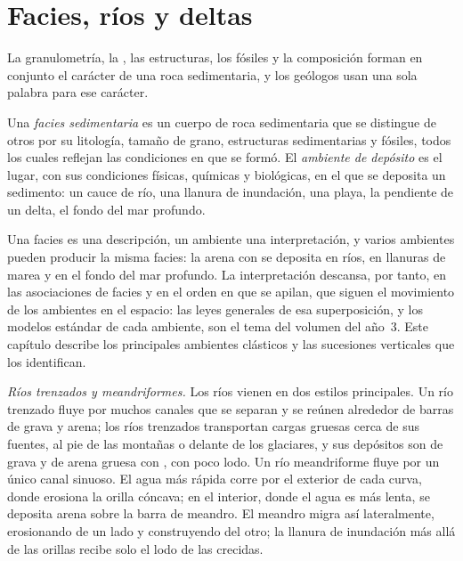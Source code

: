 \section{Facies, ríos y deltas}\label{sec:b1:clastic-sediments:rivers-deltas}

La granulometría, la , las estructuras, los fósiles y la composición forman en conjunto el carácter de una roca sedimentaria, y los geólogos usan una sola palabra para ese carácter.

\begin{definition}\label{def:b1:clastic-sediments:facies}
Una \emph{facies sedimentaria} es un cuerpo de roca sedimentaria que se distingue de otros por su litología, tamaño de grano, estructuras sedimentarias
y fósiles, todos los cuales reflejan las condiciones en que se formó. El \emph{ambiente de depósito} es el lugar, con sus condiciones físicas, químicas
y biológicas, en el que se deposita un sedimento: un cauce de río, una llanura de inundación, una playa, la pendiente de un delta, el fondo del mar profundo.
\end{definition}

Una facies es una descripción, un ambiente una interpretación, y varios ambientes pueden producir la misma facies: la arena con  se deposita en ríos, en llanuras de marea y en el
fondo del mar profundo. La interpretación descansa, por tanto, en las asociaciones de facies y en el orden en que se apilan, que siguen el movimiento de los ambientes en el espacio: las
leyes generales de esa superposición, y los modelos estándar de cada ambiente, son el tema del volumen del año~3. Este capítulo describe los principales ambientes clásticos y las sucesiones
verticales que los identifican.

\emph{Ríos trenzados y meandriformes.} Los ríos vienen en dos estilos principales. Un río trenzado fluye por muchos canales que se separan y se reúnen alrededor de barras de grava y
arena; los ríos trenzados transportan cargas gruesas cerca de sus fuentes, al pie de las montañas o delante de los glaciares, y sus depósitos son  de grava y de arena gruesa con
, con poco lodo. Un río meandriforme fluye por un único canal sinuoso. El agua más rápida corre por el exterior de cada curva, donde erosiona la orilla cóncava; en el
interior, donde el agua es más lenta, se deposita arena sobre la barra de meandro. El meandro migra así lateralmente, erosionando de un lado y construyendo del otro; la llanura de inundación más
allá de las orillas recibe solo el lodo de las crecidas.


